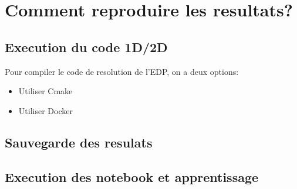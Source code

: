 

\chapter{Comment reproduire les resultats?} %

\label{AppendixA} %

\section{Execution du code 1D/2D}

Pour compiler le code de resolution de l'EDP, on a deux options:

\begin{itemize}
 \item Utiliser Cmake
 \item Utiliser Docker
\end{itemize}

\section{Sauvegarde des resulats}

\section{Execution des notebook et apprentissage}
